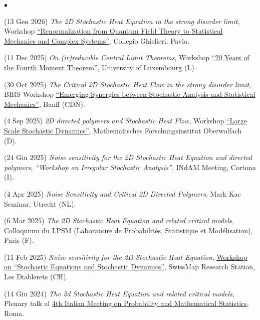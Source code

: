 \documentclass[a4paper,11pt,oneside]{amsart}
\newenvironment{myitemize}{%
\begin{list}{$\bullet$}%
 	{%
	\setlength{\itemsep}{0.3em}%
	\setlength{\topsep}{0.3em}%
	\setlength{\partopsep}{0em}%
	\setlength{\parsep}{0em}%
	\setlength{\parskip}{0em}%
	\setlength\leftmargin{1.5em}%
	\setlength\labelwidth{1.1em}%
	\setlength{\labelsep}{0.4em}%
	}%
	}%
{\end{list}}
\renewenvironment{itemize}{
\begin{myitemize}}%
{\end{myitemize}}
\begin{document}
\begin{itemize}
\item (13 Gen 2026)
\emph{The 2D Stochastic Heat Equation in the strong disorder limit},
Workshop \href{https://sites.google.com/universitadipavia.it/renormalizationspdes/home-page}{``Renormalization from Quantum Field Theory to Statistical Mechanics and Complex Systems''},
Collegio Ghislieri, Pavia.

\item (11 Dec 2025)
\emph{On (ir)reducible Central Limit Theorems},
Workshop 
\href{https://math.uni.lu/20ans/}{``20 Years of the Fourth Moment Theorem''},
University of Luxembourg (L).

\item (30 Oct 2025)
\emph{The Critical 2D Stochastic Heat Flow in the strong disorder limit},
BIRS Workshop \href{https://www.birs.ca/events/2025/5-day-workshops/25w5367}{``Emerging Synergies between Stochastic Analysis and Statistical Mechanics''},
Banff (CDN).

\item (4 Sep 2025)
\emph{2D directed polymers and Stochastic Heat Flow},
Workshop  \href{https://www.mfo.de/www/activity/2536}{``Large Scale Stochastic Dynamics''},
Mathematisches Forschungsinstitut Oberwolfach (D).

\item (24 Giu 2025)
\emph{Noise sensitivity for the 2D Stochastic Heat Equation and directed polymers},
\emph{``Workshop on Irregular Stochastic Analysis''},
INdAM Meeting, Cortona (I).

\item (4 Apr 2025)
\emph{Noise Sensitivity and Critical 2D Directed Polymers},
Mark Kac Seminar, Utrecht (NL).

\item (6 Mar 2025)
\emph{The 2D Stochastic Heat Equation and related critical models},
Colloquium du LPSM (Laboratoire de Probabilités, Statistique et Modélisation),
Paris (F).

\item (11 Feb 2025)
\emph{Noise sensitivity for the 2D Stochastic Heat Equation},
\href{https://www.epfl.ch/labs/stoan/stoan/past-events/workshop-on-stochastic-equations-and-stochastic-dynamics/}{Workshop on ``Stochastic Equations and Stochastic Dynamics''},
SwissMap Research Station, Les Diablerets (CH).

\item (14 Giu 2024)
\emph{The 2d Stochastic Heat Equation and related critical models},
Plenary talk al
\href{https://probabilityrome2024.it/plenary-speakers/}{4th Italian Meeting on
Probability and Mathematical Statistics},
Roma.


\end{itemize}
\end{document}
